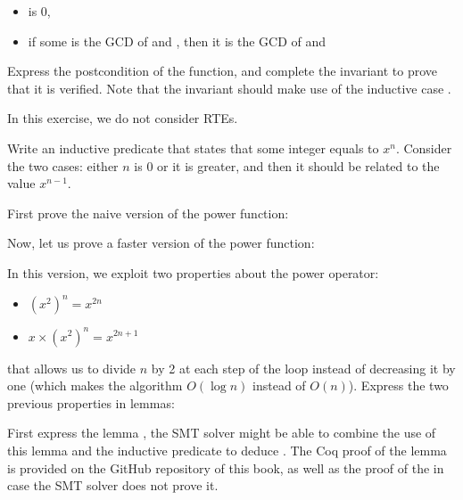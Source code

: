 \begin{itemize}
\item {} is 0,
\item if some  is the GCD of  and ,
  then it is the GCD of  and 
\end{itemize}




Express the postcondition of the function, and complete the invariant to prove
that it is verified. Note that the invariant should make use of the inductive
case .





In this exercise, we do not consider RTEs.


Write an inductive predicate that states that some integer  equals
to $x^n$. Consider the two cases: either $n$ is 0 or it is greater, and then it
should be related to the value $x^{n-1}$.




First prove the naive version of the power function:




Now, let us prove a faster version of the power function:




In this version, we exploit two properties about the power operator:


\begin{itemize}
\item $(x^2)^n = x^{2n}$
\item $x \times (x^2)^n = x^{2n+1}$
\end{itemize}


that allows us to divide $n$ by 2 at each step of the loop instead of decreasing
it by one (which makes the algorithm $O(\log n)$ instead of $O(n)$). Express the
two previous properties in lemmas:




First express the lemma , the SMT solver might be able
to combine the use of this lemma and the inductive predicate to deduce
. The Coq proof of the  lemma is
provided on the GitHub repository of this book, as well as the proof of the
 in case the SMT solver does not prove it.


